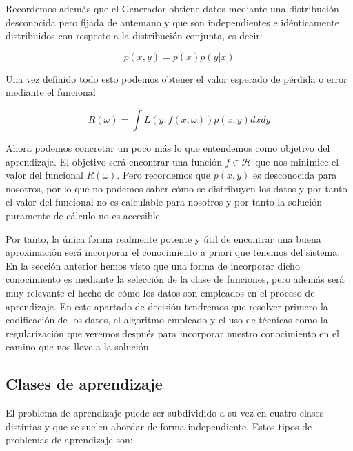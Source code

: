 Recordemos además que el Generador obtiene datos mediante una distribución desconocida pero fijada de antemano y que son independientes e idénticamente distribuidos con respecto a la distribución conjunta, es decir:

$$p(x,y) = p(x)p(y|x)$$

Una vez definido todo esto podemos obtener el valor esperado de pérdida o error mediante el funcional

$$R(\omega) = \int L(y,f(x,\omega))p(x,y)dxdy$$

Ahora podemos concretar un poco más lo que entendemos como objetivo del aprendizaje. El objetivo será encontrar una función $f\in \mathcal{H}$ que nos minimice el valor del funcional $R(\omega)$. Pero recordemos que $p(x,y)$ es desconocida para nosotros, por lo que no podemos saber cómo se distribuyen los datos y por tanto el valor del funcional no es calculable para nosotros y por tanto la solución puramente de cálculo no es accesible.

Por tanto, la única forma realmente potente y útil de encontrar una buena aproximación será incorporar el conocimiento a priori que tenemos del sistema. En la sección anterior hemos visto que una forma de incorporar dicho conocimiento es mediante la selección de la clase de funciones, pero además será muy relevante el hecho de cómo los datos son empleados en el proceso de aprendizaje. En este apartado de decisión tendremos que resolver primero la codificación de los datos, el algoritmo empleado y el uso de técnicas como la regularización que veremos después para incorporar nuestro conocimiento en el camino que nos lleve a la solución.

\subsection{Clases de aprendizaje}

El problema de aprendizaje puede ser subdividido a su vez en cuatro clases distintas y que se suelen abordar de forma independiente. Estos tipos de problemas de aprendizaje son:

